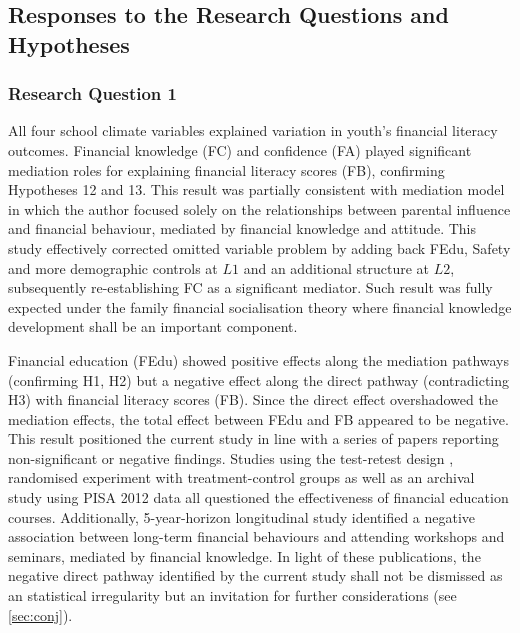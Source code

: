 \subsection{Responses to the Research Questions and Hypotheses}

\subsubsection{Research Question 1}

All four school climate variables explained variation in youth's financial literacy outcomes. Financial knowledge (FC) and confidence (FA) played significant mediation roles for explaining financial literacy scores (FB), confirming Hypotheses 12 and 13. This result was partially consistent with  mediation model in which the author focused solely on the relationships between parental influence and financial behaviour, mediated by financial knowledge and attitude. This study effectively corrected  omitted variable problem by adding back FEdu, Safety and more demographic controls at $L1$ and an additional structure at $L2$, subsequently re-establishing FC as a significant mediator. Such result was fully expected under the family financial socialisation theory \citep{danes:2007} where financial knowledge development shall be an important component.

Financial education (FEdu) showed positive effects along the mediation pathways (confirming H1, H2) but a negative effect along the direct pathway (contradicting H3) with financial literacy scores (FB). Since the direct effect overshadowed the mediation effects, the total effect between FEdu and FB appeared to be negative. This result positioned the current study in line with a series of papers reporting non-significant or negative findings. Studies using the test-retest design \citep{mandell:2009}, randomised experiment with treatment-control groups \citep{becchetti:2013, collins:2013} as well as an archival study using PISA 2012 data \citep{farinella:2017} all questioned the effectiveness of financial education courses. Additionally,  5-year-horizon longitudinal study identified a negative association between long-term financial behaviours and attending workshops and seminars, mediated by financial knowledge. In light of these publications, the negative direct pathway identified by the current study shall not be dismissed as an statistical irregularity but an invitation for further considerations (see \cref{sec:conj}).

